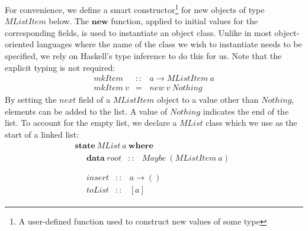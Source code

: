 \documentclass[authoryear,preprint]{sigplanconf}
\begin{document}
For convenience, we define a smart constructor\footnote{A user-defined function used to construct new values of some type} for new objects of type $\mathit{MListItem}$ below. The $\mathbf{new}$ function, applied to initial values for the corresponding fields, is used to instantiate an object class. Unlike in most object-oriented languages where the name of the class we wish to instantiate needs to be specified, we rely on Haskell's type inference to do this for us. Note that the explicit typing is not required:
\begin{displaymath}
\begin{array}{lcl}
\mathit{mkItem} & :: & a \to \mathit{MListItem}~a \\
\mathit{mkItem}~v & = & \mathit{new}~v~\mathit{Nothing}
\end{array}
\end{displaymath}
By setting the $\mathit{next}$ field of a $\mathit{MListItem}$ object to a value other than $\mathit{Nothing}$, elements can be added to the list. A value of $\mathit{Nothing}$ indicates the end of the list. To account for the empty list, we declare a $\mathit{MList}$ class which we use as the start of a linked list:
\begin{displaymath}
\begin{array}{l}
\mathbf{state}~\mathit{MList}~a~\mathbf{where} \\
\quad \begin{array}{lcl}
\mathbf{data}~\mathit{root}  & :: & \mathit{Maybe}~(\mathit{MListItem}~a)
\end{array}\\\\
\quad \begin{array}{lcl}
\mathit{insert} & :: & a \to () \\
\mathit{toList} & :: & [a]
\end{array}
\end{array}
\end{displaymath}
\end{document}
